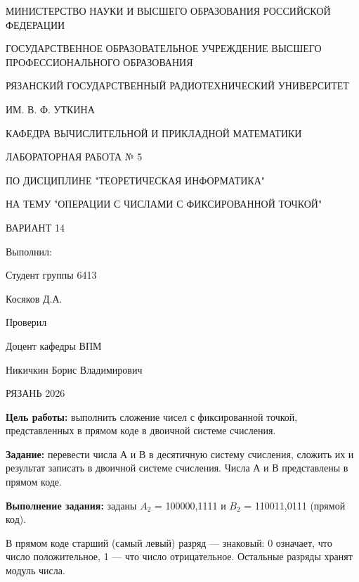 \documentclass[a4paper, 12pt]{article}
\begin{document}
\begin{center}
    МИНИСТЕРСТВО НАУКИ И ВЫСШЕГО ОБРАЗОВАНИЯ РОССИЙСКОЙ ФЕДЕРАЦИИ

    ГОСУДАРСТВЕННОЕ ОБРАЗОВАТЕЛЬНОЕ УЧРЕЖДЕНИЕ ВЫСШЕГО ПРОФЕССИОНАЛЬНОГО ОБРАЗОВАНИЯ

    РЯЗАНСКИЙ ГОСУДАРСТВЕННЫЙ РАДИОТЕХНИЧЕСКИЙ УНИВЕРСИТЕТ

    ИМ. В. Ф. УТКИНА

    КАФЕДРА ВЫЧИСЛИТЕЛЬНОЙ И ПРИКЛАДНОЙ МАТЕМАТИКИ
\end{center}

\vspace{5 cm}

\begin{center}
    ЛАБОРАТОРНАЯ РАБОТА № 5

    ПО ДИСЦИПЛИНЕ "ТЕОРЕТИЧЕСКАЯ ИНФОРМАТИКА"

    НА ТЕМУ "ОПЕРАЦИИ С ЧИСЛАМИ С ФИКСИРОВАННОЙ ТОЧКОЙ"

    ВАРИАНТ 14

\end{center}

\vspace{7 cm}

\begin{flushright}
    Выполнил:

    Студент группы 6413

    Косяков Д.А.

    Проверил

    Доцент кафедры ВПМ

    Никичкин Борис Владимирович
\end{flushright}

\begin{center}
    РЯЗАНЬ 2026
\end{center}

\pagebreak

\textbf{ Цель работы:} выполнить сложение чисел с фиксированной точкой, представленных в прямом коде в двоичной системе счисления.

\textbf{ Задание:} перевести числа А и В в десятичную систему счисления,
сложить их и результат записать в двоичной системе счисления.
Числа А и В представлены в прямом коде.

\textbf{ Выполнение задания:} заданы $A_2$ = 100000,1111 и $B_2$ = 110011,0111 (прямой код).

В прямом коде старший (самый левый) разряд --- знаковый: 0 означает, что число положительное,
1 --- что число отрицательное. Остальные разряды хранят модуль числа.
\end{document}
